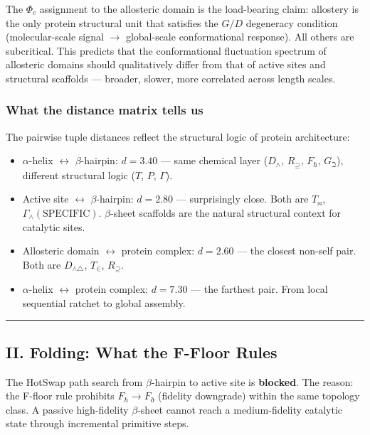 \documentclass[12pt,a4paper]{article}
\begin{document}
The $\Phi_c$ assignment to the allosteric domain is the load-bearing claim: allostery is the only protein structural unit that satisfies the $G/D$ degeneracy condition (molecular-scale signal $\rightarrow$ global-scale conformational response). All others are subcritical. This predicts that the conformational fluctuation spectrum of allosteric domains should qualitatively differ from that of active sites and structural scaffolds --- broader, slower, more correlated across length scales.

\subsubsection{What the distance matrix tells us}

The pairwise tuple distances reflect the structural logic of protein architecture:

\begin{itemize}
    \item $\alpha$-helix $\leftrightarrow$ $\beta$-hairpin: $d = 3.40$ --- same chemical layer ($D_\wedge$, $R_\supseteq$, $F_\hbar$, $G_\beth$), different structural logic ($T$, $P$, $\Gamma$).
    \item Active site $\leftrightarrow$ $\beta$-hairpin: $d = 2.80$ --- surprisingly close. Both are $T_\bowtie$, $\Gamma_\wedge(\text{SPECIFIC})$. $\beta$-sheet scaffolds are the natural structural context for catalytic sites.
    \item Allosteric domain $\leftrightarrow$ protein complex: $d = 2.60$ --- the closest non-self pair. Both are $D_{\wedge\triangle}$, $T_\in$, $R_\supseteq$.
    \item $\alpha$-helix $\leftrightarrow$ protein complex: $d = 7.30$ --- the farthest pair. From local sequential ratchet to global assembly.
\end{itemize}

\begin{center}
\rule{0.5\textwidth}{0.4pt}
\end{center}

\subsection{II. Folding: What the F-Floor Rules}

The HotSwap path search from $\beta$-hairpin to active site is \textbf{blocked}. The reason: the F-floor rule prohibits $F_\hbar \to F_\eth$ (fidelity downgrade) within the same topology class. A passive high-fidelity $\beta$-sheet cannot reach a medium-fidelity catalytic state through incremental primitive steps.
\end{document}
